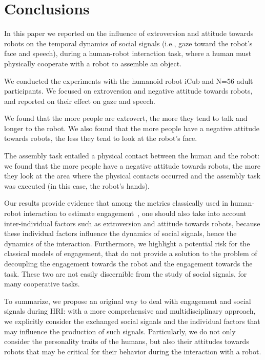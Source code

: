 \section{Conclusions}

In this paper we reported on the influence of extroversion and attitude towards robots on the temporal dynamics of social signals (i.e., gaze toward the robot's face and speech), during a human-robot interaction task, where a human must physically cooperate with a robot to assemble an object. 

We conducted the experiments with the humanoid robot iCub and N=56 adult participants. 
We focused on extroversion and negative attitude towards robots, and reported on their effect on gaze and speech.

We found that the more people are extrovert, the more they tend to talk and longer to the robot. We also found that the more people have a negative attitude towards robots, the less they tend to look at the robot's face. 

The assembly task entailed a physical contact between the human and the robot: we found that the more people have a negative attitude towards robots, the more they look at the area where the physical contacts occurred and the assembly task was executed  (in this case, the robot's hands). 

Our results provide evidence that among the metrics classically used in human-robot interaction to estimate engagement~\cite{rich2010recognizing}, one should also take into account inter-individual factors such as extroversion and attitude towards robots, because these individual factors influence the dynamics of social signals, hence the dynamics of the interaction. 
Furthermore, we highlight a potential risk for the classical models of engagement, that do not provide a solution to the problem of decoupling the engagement towards the robot and the engagement towards the task. These two are not easily discernible from the study of social signals, for many cooperative tasks.

To summarize, we propose an original way to deal with engagement and social signals during HRI: with a more comprehensive and multidisciplinary approach, we explicitly consider the exchanged social signals and the individual factors that may influence the production of such signals. Particularly, we do not only consider the personality traits of the humans, but also their attitudes towards robots that may be critical for their behavior during the interaction with a robot. 
  
